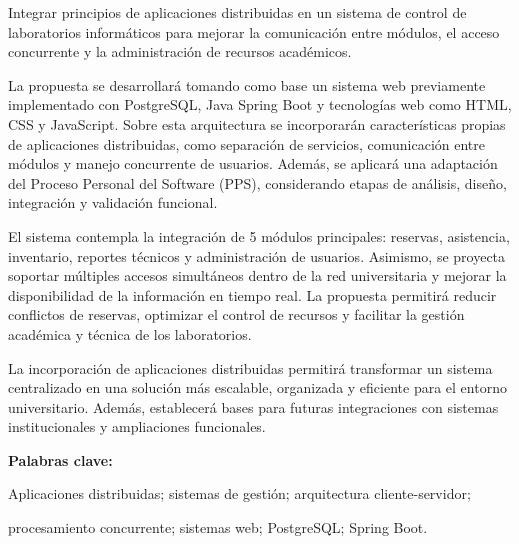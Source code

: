 \documentclass[12pt,a4paper]{article}
\begin{document}
\begin{tcolorbox}

Integrar principios de aplicaciones distribuidas en un sistema de control de laboratorios informáticos para mejorar la comunicación entre módulos, el acceso concurrente y la administración de recursos académicos.

\vspace{0.2cm}

La propuesta se desarrollará tomando como base un sistema web previamente implementado con PostgreSQL, Java Spring Boot y tecnologías web como HTML, CSS y JavaScript. Sobre esta arquitectura se incorporarán características propias de aplicaciones distribuidas, como separación de servicios, comunicación entre módulos y manejo concurrente de usuarios. Además, se aplicará una adaptación del Proceso Personal del Software (PPS), considerando etapas de análisis, diseño, integración y validación funcional.

\vspace{0.2cm}

El sistema contempla la integración de 5 módulos principales: reservas, asistencia, inventario, reportes técnicos y administración de usuarios. Asimismo, se proyecta soportar múltiples accesos simultáneos dentro de la red universitaria y mejorar la disponibilidad de la información en tiempo real. La propuesta permitirá reducir conflictos de reservas, optimizar el control de recursos y facilitar la gestión académica y técnica de los laboratorios.

\vspace{0.2cm}

La incorporación de aplicaciones distribuidas permitirá transformar un sistema centralizado en una solución más escalable, organizada y eficiente para el entorno universitario. Además, establecerá bases para futuras integraciones con sistemas institucionales y ampliaciones funcionales.


\end{tcolorbox}

\vspace{5.5cm}

\textbf{Palabras clave:}

\vspace{0.2cm}

Aplicaciones distribuidas; sistemas de gestión; arquitectura cliente-servidor;

\vspace{0.01cm}

procesamiento concurrente; sistemas web; PostgreSQL; Spring Boot.
\end{document}
